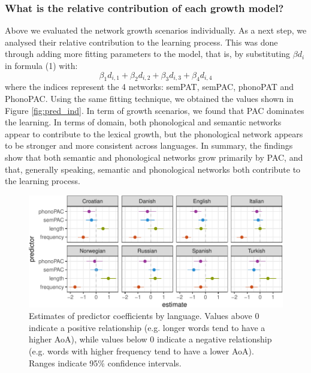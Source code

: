 \documentclass[10pt, letterpaper]{article}
\newenvironment{CodeChunk}{}{}
\begin{document}
\subsubsection{What is the relative contribution of each growth
model?}\label{what-is-the-relative-contribution-of-each-growth-model}

Above we evaluated the network growth scenarios individually. As a next
step, we analysed their relative contribution to the learning process.
This was done through adding more fitting parameters to the model, that
is, by substituting \(\beta d_i\) in formula (1) with:
\[\beta_{1} d_{i, 1} + \beta_{2} d_{i, 2} + \beta_{3} d_{i, 3} + \beta_{4} d_{i, 4}\]
where the indices represent the 4 networks: semPAT, semPAC, phonoPAT and
PhonoPAC. Using the same fitting technique, we obtained the values shown
in Figure \ref{fig:pred_ind}. In term of growth scenarios, we found that
PAC dominates the learning. In terms of domain, both phonological and
semantic networks appear to contribute to the lexical growth, but the
phonological network appears to be stronger and more consistent across
languages. In summary, the findings show that both semantic and
phonological networks grow primarily by PAC, and that, generally
speaking, semantic and phonological networks both contribute to the
learning process.

\begin{CodeChunk}
\begin{figure}[h]

{\centering \includegraphics{figs/regressions_img-1} 

}

\caption{\label{fig:regressions_img}Estimates of predictor coefficients by language. Values above 0 indicate a positive relationship (e.g. longer words tend to have a higher AoA), while values below 0 indicate a negative relationship (e.g. words with higher frequency tend to have a lower AoA). Ranges indicate 95\% confidence intervals.}\label{fig:regressions_img}
\end{figure}
\end{CodeChunk}
\end{document}
